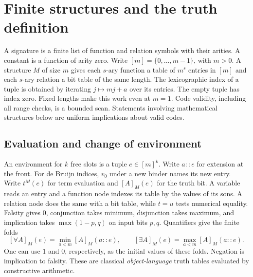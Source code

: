 \section{Finite structures and the truth definition}\label{sec:models}
A signature is a finite list of function and relation symbols with their arities. A constant is a function of arity zero. Write $[m]=\{0,\ldots,m-1\}$, with $m>0$. A structure $M$ of size $m$ gives each $s$-ary function a table of $m^s$ entries in $[m]$ and each $s$-ary relation a bit table of the same length. The lexicographic index of a tuple is obtained by iterating $j\mapsto mj+a$ over its entries. The empty tuple has index zero. Fixed lengths make this work even at $m=1$. Code validity, including all range checks, is a bounded scan. Statements involving mathematical structures below are uniform implications about valid codes.

\subsection{Evaluation and change of environment}
An environment for $k$ free slots is a tuple $e\in[m]^k$. Write $a::e$ for extension at the front. For de Bruijn indices, $v_0$ under a new binder names its new entry. Write $t^M(e)$ for term evaluation and $[A]_M(e)$ for the truth bit. A variable reads an entry and a function node indexes its table by the values of its sons. A relation node does the same with a bit table, while $t=u$ tests numerical equality. Falsity gives $0$, conjunction takes minimum, disjunction takes maximum, and implication takes $\max(1-p,q)$ on input bits $p,q$. Quantifiers give the finite folds
\[
 [\forall A]_M(e)=\min_{a<m}[A]_M(a::e),\qquad
 [\exists A]_M(e)=\max_{a<m}[A]_M(a::e).
\]
One can use $1$ and $0$, respectively, as the initial values of these folds. Negation is implication to falsity. These are classical \emph{object-language} truth tables evaluated by constructive arithmetic.

